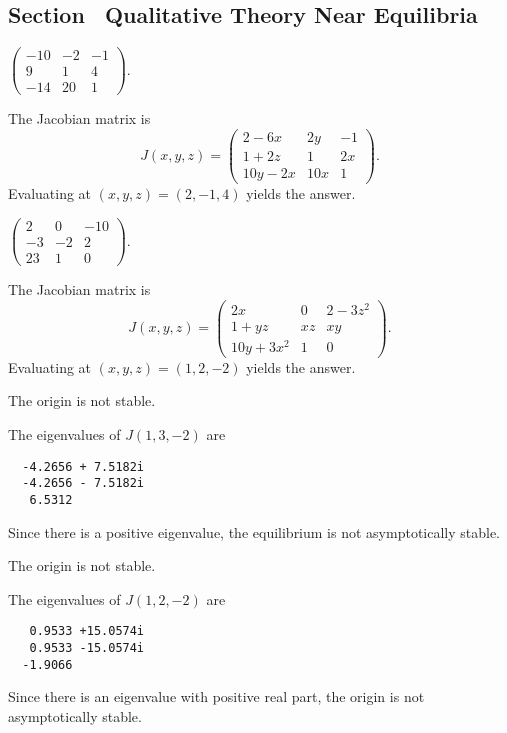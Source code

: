 \subsection*{Section~\protect{\ref{S:QT}} Qualitative Theory Near Equilibria}


 \ans $\left(\begin{array}{rrr}
-10 & -2 & -1\\ 9 & 1 & 4 \\ -14 & 20 & 1\end{array}\right)$.

\vspace{0.08in}

\soln  The Jacobian matrix is
\[
J(x,y,z) = \left(\begin{array}{ccc}
2 - 6x & 2y & -1\\ 1+2z & 1 & 2x\\ 10y-2x & 10x & 1\end{array}\right).
\]
Evaluating at $(x,y,z)=(2,-1,4)$ yields the answer.

 \ans $\left(\begin{array}{rrr}
2 & 0 & -10\\ -3 & -2 & 2 \\ 23 & 1 & 0 \end{array}\right)$.

\vspace{0.08in}

\soln  The Jacobian matrix is
\[
J(x,y,z) = \left(\begin{array}{ccc}
2x & 0 & 2-3z^2\\ 1+yz & xz & xy\\ 10y+3x^2 & 1 & 0 \end{array}\right).
\]
Evaluating at $(x,y,z)=(1,2,-2)$ yields the answer.


 \ans The origin is not stable.

\soln The eigenvalues of $J(1,3,-2)$ are
\begin{verbatim}
  -4.2656 + 7.5182i
  -4.2656 - 7.5182i
   6.5312          
\end{verbatim}
Since there is a positive eigenvalue, the equilibrium is not 
asymptotically stable.


 \ans The origin is not stable.

\soln The eigenvalues of $J(1,2,-2)$ are
\begin{verbatim}
   0.9533 +15.0574i
   0.9533 -15.0574i
  -1.9066    
\end{verbatim}
Since there is an eigenvalue with positive real part, the origin is not 
asymptotically stable.

